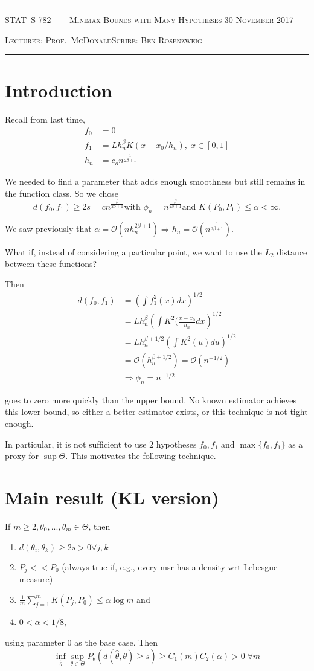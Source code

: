 \documentclass[10pt]{article}
\newcounter{lecnum}
\renewcommand{\hat}{\widehat}
\renewcommand{\O}{\ensuremath{\mathcal{O}}}
\newcommand{\lecturer}{Prof.\ McDonald}
\newcommand{\scribe}{Ben Rosenzweig}
\newcommand{\chtitle}{Minimax Bounds with Many Hypotheses}
\newcommand{\lecdate}{30 November 2017}
\begin{document}
\rule{6.5in}{1pt}

\textsc{STAT--S 782
        \hfill \thelecnum\ --- \chtitle
        \hfill \lecdate}

\textsc{Lecturer: \lecturer \hfill Scribe: \scribe}
\rule{6.5in}{1pt}

\section{Introduction}
Recall from last time,
\begin{align*}
f_0&=0\\
f_1 &= Lh_n^\beta K(x-x_0 / h_n),\; x\in[0,1]\\
h_n &= c_o n^{\frac{1}{2\beta+1}}
\end{align*}

We needed to find a parameter that adds enough smoothness but still remains in the function class.
So we chose 
\[
d(f_0,f_1) \geq 2s = cn^{\frac{\beta}{2\beta+1}}\text{with $\phi_n = n^{\frac{\beta}{2\beta+1}}$
and $K(P_0,P_1)\leq\alpha<\infty$.} 
\]

We saw previously that $\alpha=\O(nh_n^{2\beta+1}) \Rightarrow h_n=\O( n^{\frac{1}{2\beta+1}} )$.

What if, instead of considering a particular point, we want to use the $L_2$ distance between these functions?

Then 
\begin{align*}
d(f_0,f_1) &= \left(
		\int f_1^2(x)dx
	\right)^{1/2} \\
&= Lh_n^\beta
	\left(
		\int K^2(\frac{x-x_0}{h_n}dx
		\right)^{1/2}\\
&= Lh_n^{\beta+1/2} 
	\left(
		\int K^2(u)du
	\right)^{1/2}\\
&=\O(h_n^{\beta+1/2})=\O(n^{-1/2})\\
&\Rightarrow \phi_n = n^{-1/2}
\end{align*}

goes to zero more quickly than the upper bound.  No known estimator achieves this lower bound, so either a better estimator exists, or this technique is not tight enough.
  
In particular, it is not sufficient to use 2 hypotheses $f_0,f_1$ and $\max\{f_0,f_1\}$ as a proxy for $\sup\Theta.$
This motivates the following technique.

\section{Main result (KL version)}
If $m\geq 2, \theta_0,...,\theta_m\in\Theta$, then
\begin{enumerate}
\item $d(\theta_i,\theta_k)\geq2s>0\forall j,k$
\item $P_j<<P_0$ (always true if, e.g., every msr has a density wrt Lebesgue measure)
\item $\frac{1}{m}\sum_{j=1}^mK(P_j,P_0)\leq \alpha\log m$ and 
\item $0<\alpha<1/8$,
\end{enumerate}
using parameter 0 as the base case.  Then \[\inf_{\hat{\theta}}\sup_{\theta\in\Theta} P_\theta(d(\hat{\theta},\theta)\geq s) \geq C_1(m)C_2(\alpha)>0 \;\forall m\]
\end{document}
